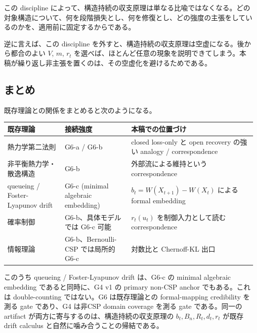 \documentclass[12pt,a4paper]{article}
\begin{document}
この discipline によって、構造持続の収支原理は単なる比喩ではなくなる。どの対象構造について、何を段階損失とし、何を修復とし、どの強度の主張をしているのかを、適用前に固定するからである。

逆に言えば、この discipline を外すと、構造持続の収支原理は空虚になる。後から都合のよい \(V\), \(m\), \(r_{t}\) を選べば、ほとんど任意の現象を説明できてしまう。本稿が繰り返し非主張を置くのは、その空虚化を避けるためである。

\subsection{まとめ}\label{ux307eux3068ux3081}

既存理論との関係をまとめると次のようになる。

{\def\LTcaptype{table} %
\begin{longtable}[]{@{}
  >{\raggedright\arraybackslash}p{}
  >{\raggedright\arraybackslash}p{}
  >{\raggedright\arraybackslash}p{}@{}}
\toprule\noalign{}
\begin{minipage}[b]{\linewidth}\raggedright
既存理論
\end{minipage} & \begin{minipage}[b]{\linewidth}\raggedright
接続強度
\end{minipage} & \begin{minipage}[b]{\linewidth}\raggedright
本稿での位置づけ
\end{minipage} \\
\midrule\noalign{}
\endhead
\bottomrule\noalign{}
\endlastfoot
熱力学第二法則 & G6-a / G6-b & closed loss-only と open recovery の強い analogy / correspondence \\
非平衡熱力学・散逸構造 & G6-b & 外部流による維持という correspondence \\
queueing / Foster-Lyapunov drift & G6-c (minimal algebraic embedding) & \(b_t=W(X_{t+1})-W(X_t)\) による formal embedding \\
確率制御 & G6-b、具体モデルでは G6-c 可能 & \(r_t(u_t)\) を制御入力として読む correspondence \\
情報理論 & G6-b、Bernoulli-CSP では局所的 G6-c & 対数比と Chernoff-KL 出口 \\
\end{longtable}
}

このうち queueing / Foster-Lyapunov drift は、G6-c の minimal algebraic embedding であると同時に、G4 v1 の primary non-CSP anchor でもある。これは double-counting ではない。G6 は既存理論との formal-mapping credibility を測る gate であり、G4 は非CSP domain coverage を測る gate である。同一の artifact が両方に寄与するのは、構造持続の収支原理の \(b_{t},B_{n},R_{t},d_{t},r_{t}\) が既存 drift calculus と自然に噛み合うことの帰結である。
\end{document}

